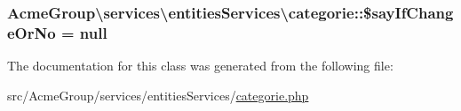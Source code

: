 \hypertarget{class_acme_group_1_1services_1_1entities_services_1_1categorie_adffb71e2052cbe99e47aaa66e1d388ec}{
\subsubsection[{\$say\+If\+Change\+Or\+No}]{\setlength{\rightskip}{0pt plus 5cm}Acme\+Group\textbackslash{}services\textbackslash{}entities\+Services\textbackslash{}categorie\+::\$say\+If\+Change\+Or\+No = {\bf null}\hspace{0.3cm}{\ttfamily [protected]}}}\label{class_acme_group_1_1services_1_1entities_services_1_1categorie_adffb71e2052cbe99e47aaa66e1d388ec}


The documentation for this class was generated from the following file\+:\begin{DoxyCompactItemize}
\item 
src/\+Acme\+Group/services/entities\+Services/\hyperlink{services_2entities_services_2categorie_8php}{categorie.\+php}\end{DoxyCompactItemize}
